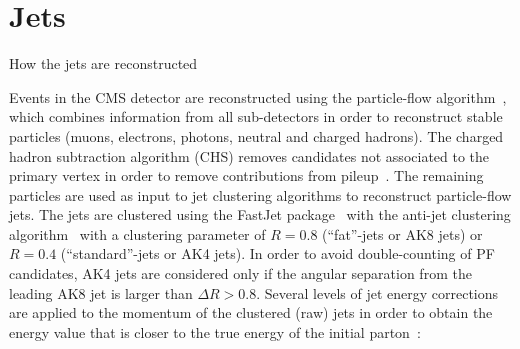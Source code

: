 \clearpage


\section{Jets}\label{ssec:jets}
{\color{red} How the jets are reconstructed}

Events in the CMS detector are reconstructed using the particle-flow algorithm~\cite{bib:PF1,bib:PF2}, which combines information from all sub-detectors in order to reconstruct stable particles (muons, electrons, photons, neutral and charged hadrons). The charged hadron subtraction algorithm (CHS) removes candidates not associated to the primary vertex in order to remove contributions from pileup~\cite{CMS-PAS-JME-14-001}. The remaining particles are used as input to jet clustering algorithms to reconstruct particle-flow jets. The jets are clustered using the {\sc FastJet} package~\cite{bib:fastjet} with the anti-\kt jet clustering algorithm~\cite{Cacciari:2008gp} with a clustering parameter of $R = 0.8$ (``fat''-jets or AK8 jets) or $R = 0.4$ (``standard''-jets or AK4 jets). In order to avoid double-counting of PF candidates, AK4 jets are considered only if the angular separation from the leading AK8 jet is larger than $\Delta R>0.8$.
Several levels of jet energy corrections are applied to the momentum of the clustered (raw) jets in order to obtain the energy value that is closer to the true energy of the initial parton~\cite{bib:1748-0221-6-11-P11002}:

